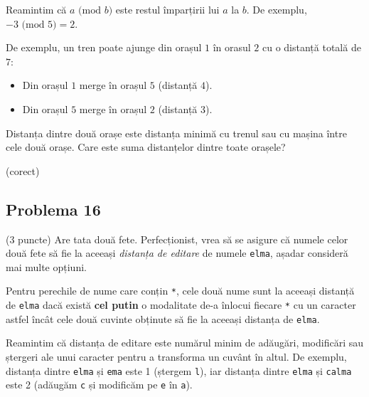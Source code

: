 \documentclass{exam}
\begin{document}
Reamintim că $a\textrm{ (mod $b$)}$ este restul împarțirii lui $a$ la $b$. De exemplu, $-3 \textrm{ (mod 5)} = 2$.

De exemplu, un tren poate ajunge din orașul $1$ în orasul $2$ cu o distanță totală de $7$:
\begin{itemize}
    \item Din orașul $1$ merge în orașul $5$ (distanță $4$).
    \item Din orașul $5$ merge în orașul $2$ (distanță $3$).
\end{itemize}

Distanța dintre două orașe este distanța minimă cu trenul sau cu mașina între cele două orașe. Care este suma distanțelor dintre toate orașele?



\begin{oneparchoices}
  (corect)
\end{oneparchoices}



\subsection*{Problema 16}

(3 puncte) Are tata două fete. Perfecționist, vrea să se asigure că numele celor două fete să fie la aceeași \textit{distanța de editare} de numele \texttt{elma}, așadar consideră mai multe opțiuni.

Pentru perechile de nume care conțin \texttt{*}, cele două nume sunt la aceeași distanță de \texttt{elma} dacă există \textbf{cel putin} o modalitate de-a înlocui fiecare \texttt{*} cu un caracter astfel încât cele două cuvinte obținute să fie la aceeași distanța de \texttt{elma}.

Reamintim că distanța de editare este numărul minim de adăugări, modificări sau ștergeri ale unui caracter pentru a transforma un cuvânt în altul. De exemplu, distanța dintre \texttt{elma} și \texttt{ema} este 1 (ștergem \texttt{l}), iar distanța dintre \texttt{elma} și \texttt{calma} este 2 (adăugăm \texttt{c} și modificăm pe \texttt{e} în \texttt{a}).
\end{document}
